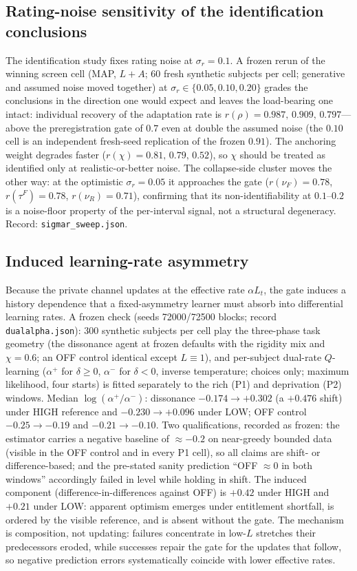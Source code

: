 \documentclass[11pt]{article}
\newcommand{\1}{\mathbf{1}}
\begin{document}
\subsection{Rating-noise sensitivity of the identification conclusions}
The identification study fixes rating noise at $\sigma_r=0.1$. A frozen rerun of the
winning screen cell (MAP, $L{+}A$; 60 fresh synthetic subjects per cell; generative and
assumed noise moved together) at $\sigma_r\in\{0.05,0.10,0.20\}$ grades the conclusions
in the direction one would expect and leaves the load-bearing one intact: individual
recovery of the adaptation rate is $r(\rho)=0.987,\,0.909,\,0.797$---above the
preregistration gate of $0.7$ even at double the assumed noise (the $0.10$ cell is an
independent fresh-seed replication of the frozen $0.91$). The anchoring weight degrades
faster ($r(\chi)=0.81,\,0.79,\,0.52$), so $\chi$ should be treated as identified only at
realistic-or-better noise. The collapse-side cluster moves the other way: at the
optimistic $\sigma_r=0.05$ it approaches the gate ($r(\nu_F)=0.78$, $r(\tau^F)=0.78$,
$r(\nu_R)=0.71$), confirming that its non-identifiability at $0.1$--$0.2$ is a
noise-floor property of the per-interval signal, not a structural degeneracy. Record:
\texttt{sigmar\_sweep.json}.

\subsection{Induced learning-rate asymmetry}
\label{ss:dualalpha}
Because the private channel updates at the effective rate $\alpha L_t$, the gate induces
a history dependence that a fixed-asymmetry learner must absorb into differential
learning rates. A frozen check (seeds 72000/72500 blocks; record
\texttt{dualalpha.json}): 300 synthetic subjects per cell play the three-phase task
geometry (the dissonance agent at frozen defaults with the rigidity mix and $\chi=0.6$;
an OFF control identical except $L\equiv1$), and per-subject dual-rate $Q$-learning
($\alpha^+$ for $\delta\ge0$, $\alpha^-$ for $\delta<0$, inverse temperature; choices
only; maximum likelihood, four starts) is fitted separately to the rich (P1) and
deprivation (P2) windows. Median $\log(\alpha^+/\alpha^-)$: dissonance
$-0.174\to+0.302$ (a $+0.476$ shift) under HIGH reference and $-0.230\to+0.096$ under LOW; OFF control
$-0.25\to-0.19$ and $-0.21\to-0.10$. Two qualifications, recorded as frozen: the
estimator carries a negative baseline of $\approx-0.2$ on near-greedy bounded data
(visible in the OFF control and in every P1 cell), so all claims are shift- or
difference-based; and the pre-stated sanity prediction ``OFF $\approx0$ in both
windows'' accordingly failed in level while holding in shift. The induced component
(difference-in-differences against OFF) is $+0.42$ under HIGH and $+0.21$ under LOW:
apparent optimism emerges under entitlement shortfall, is ordered by the visible
reference, and is absent without the gate. The mechanism is composition, not updating:
failures concentrate in low-$L$ stretches their predecessors eroded, while successes
repair the gate for the updates that follow, so negative prediction errors
systematically coincide with lower effective rates.
\end{document}
